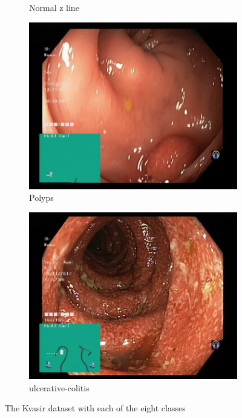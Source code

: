 \begin{figure}
\begin{subfigure}[b]{0.4\textwidth}
            \caption{{\small Normal z line}}    
            \label{fig:kvasir-normal-z-line}
        \end{subfigure}
        \qquad\vfill%
        \begin{subfigure}[b]{0.4\textwidth}   
            \centering 
            \includegraphics[width=\textwidth]{experiments/images/polyps.jpg}
            \caption{{\small Polyps}}    
            \label{fig:kvasir-polyps}
        \end{subfigure}
        \qquad%
        \begin{subfigure}[b]{0.4\textwidth}   
            \centering 
            \includegraphics[width=\textwidth]{experiments/images/ulcerative-colitis.jpg}
            \caption{{\small ulcerative-colitis}}    
            \label{fig:kvasir-ulcerative-colitis}
        \end{subfigure}
        \caption{\small The Kvasir dataset with each of the eight classes} 
        \label{fig:Kvasir}
    \end{figure}
    



